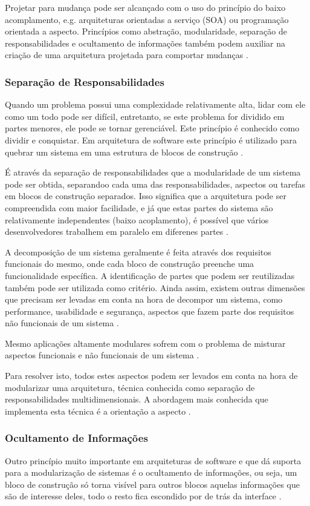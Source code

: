 \documentclass[diss]{template/setrem}
\begin{document}
Projetar para mudança pode ser alcançado com o uso do princípio do baixo acomplamento, e.g. arquiteturas orientadas a serviço (SOA) ou programação orientada a aspecto. Princípios como abstração, modularidade, separação de responsabilidades e ocultamento de informações também podem auxiliar na criação de uma arquitetura projetada para comportar mudanças \citep{Vogel2011}.

\subsubsection{Separação de Responsabilidades}
Quando um problema possui uma complexidade relativamente alta, lidar com ele como um todo pode ser difícil, entretanto, se este problema for dividido em partes menores, ele pode se tornar gerenciável. Este princípio é conhecido como dividir e conquistar. Em arquitetura de software este princípio é utilizado para quebrar um sistema em uma estrutura de blocos de construção \citep{Vogel2011}.

É através da separação de responsabilidades que a modularidade de um sistema pode ser obtida, separandoo cada uma das responsabilidades, aspectos ou tarefas em blocos de construção separados. Isso significa que a arquitetura pode ser compreendida com maior facilidade, e já que estas partes do sistema são relativamente independentes (baixo acoplamento), é possível que vários desenvolvedores trabalhem em paralelo em diferenes partes \citep{Vogel2011}.

A decomposição de um sistema geralmente é feita através dos requisitos funcionais do mesmo, onde cada bloco de construção preenche uma funcionalidade específica. A identificação de partes que podem ser reutilizadas também pode ser utilizada como critério. Ainda assim, existem outras dimensões que precisam ser levadas em conta na hora de decompor um sistema, como performance, usabilidade e segurança, aspectos que fazem parte dos requisitos não funcionais de um sistema \citep{Vogel2011}.

Mesmo aplicações altamente modulares sofrem com o problema de misturar aspectos funcionais e não funcionais de um sistema \citep{Gorton2011}.

Para resolver isto, todos estes aspectos podem ser levados em conta na hora de modularizar uma arquitetura, técnica conhecida como separação de responsabilidades multidimensionais. A abordagem mais conhecida que implementa esta técnica é a orientação a aspecto \citep{Vogel2011}.

\subsubsection{Ocultamento de Informações}
Outro princípio muito importante em arquiteturas de software e que dá suporta para a modularização de sistemas é o ocultamento de informações, ou seja, um bloco de construção só torna visível para outros blocos aquelas informações que são de interesse deles, todo o resto fica escondido por de trás da interface \citep{Vogel2011}.
\end{document}
